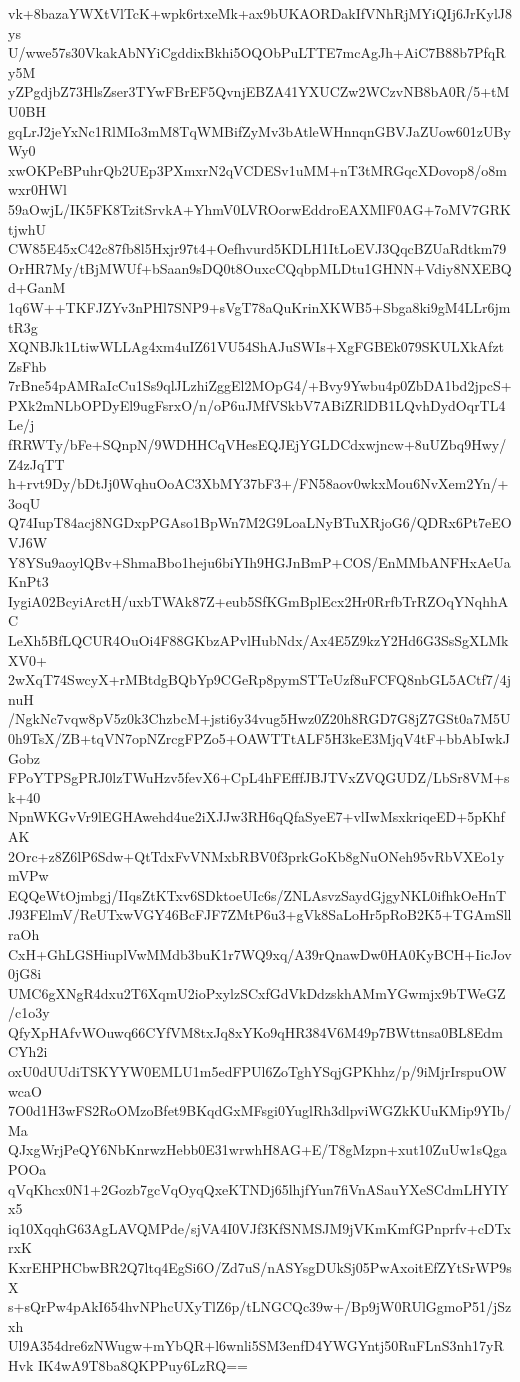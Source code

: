 vk+8bazaYWXtVlTcK+wpk6rtxeMk+ax9bUKAORDakIfVNhRjMYiQIj6JrKylJ8ys
U/wwe57s30VkakAbNYiCgddixBkhi5OQObPuLTTE7mcAgJh+AiC7B88b7PfqRy5M
yZPgdjbZ73HlsZser3TYwFBrEF5QvnjEBZA41YXUCZw2WCzvNB8bA0R/5+tMU0BH
gqLrJ2jeYxNc1RlMIo3mM8TqWMBifZyMv3bAtleWHnnqnGBVJaZUow601zUByWy0
xwOKPeBPuhrQb2UEp3PXmxrN2qVCDESv1uMM+nT3tMRGqcXDovop8/o8mwxr0HWl
59aOwjL/IK5FK8TzitSrvkA+YhmV0LVROorwEddroEAXMlF0AG+7oMV7GRKtjwhU
CW85E45xC42c87fb8l5Hxjr97t4+Oefhvurd5KDLH1ItLoEVJ3QqcBZUaRdtkm79
OrHR7My/tBjMWUf+bSaan9sDQ0t8OuxcCQqbpMLDtu1GHNN+Vdiy8NXEBQd+GanM
1q6W++TKFJZYv3nPHl7SNP9+sVgT78aQuKrinXKWB5+Sbga8ki9gM4LLr6jmtR3g
XQNBJk1LtiwWLLAg4xm4uIZ61VU54ShAJuSWIs+XgFGBEk079SKULXkAfztZsFhb
7rBne54pAMRaIcCu1Ss9qlJLzhiZggEl2MOpG4/+Bvy9Ywbu4p0ZbDA1bd2jpcS+
PXk2mNLbOPDyEl9ugFsrxO/n/oP6uJMfVSkbV7ABiZRlDB1LQvhDydOqrTL4Le/j
fRRWTy/bFe+SQnpN/9WDHHCqVHesEQJEjYGLDCdxwjncw+8uUZbq9Hwy/Z4zJqTT
h+rvt9Dy/bDtJj0WqhuOoAC3XbMY37bF3+/FN58aov0wkxMou6NvXem2Yn/+3oqU
Q74IupT84acj8NGDxpPGAso1BpWn7M2G9LoaLNyBTuXRjoG6/QDRx6Pt7eEOVJ6W
Y8YSu9aoylQBv+ShmaBbo1heju6biYIh9HGJnBmP+COS/EnMMbANFHxAeUaKnPt3
IygiA02BcyiArctH/uxbTWAk87Z+eub5SfKGmBplEcx2Hr0RrfbTrRZOqYNqhhAC
LeXh5BfLQCUR4OuOi4F88GKbzAPvlHubNdx/Ax4E5Z9kzY2Hd6G3SsSgXLMkXV0+
2wXqT74SwcyX+rMBtdgBQbYp9CGeRp8pymSTTeUzf8uFCFQ8nbGL5ACtf7/4jnuH
/NgkNc7vqw8pV5z0k3ChzbcM+jsti6y34vug5Hwz0Z20h8RGD7G8jZ7GSt0a7M5U
0h9TsX/ZB+tqVN7opNZrcgFPZo5+OAWTTtALF5H3keE3MjqV4tF+bbAbIwkJGobz
FPoYTPSgPRJ0lzTWuHzv5fevX6+CpL4hFEfffJBJTVxZVQGUDZ/LbSr8VM+sk+40
NpnWKGvVr9lEGHAwehd4ue2iXJJw3RH6qQfaSyeE7+vlIwMsxkriqeED+5pKhfAK
2Orc+z8Z6lP6Sdw+QtTdxFvVNMxbRBV0f3prkGoKb8gNuONeh95vRbVXEo1ymVPw
EQQeWtOjmbgj/IIqsZtKTxv6SDktoeUIc6s/ZNLAsvzSaydGjgyNKL0ifhkOeHnT
J93FElmV/ReUTxwVGY46BcFJF7ZMtP6u3+gVk8SaLoHr5pRoB2K5+TGAmSllraOh
CxH+GhLGSHiuplVwMMdb3buK1r7WQ9xq/A39rQnawDw0HA0KyBCH+IicJov0jG8i
UMC6gXNgR4dxu2T6XqmU2ioPxylzSCxfGdVkDdzskhAMmYGwmjx9bTWeGZ/c1o3y
QfyXpHAfvWOuwq66CYfVM8txJq8xYKo9qHR384V6M49p7BWttnsa0BL8EdmCYh2i
oxU0dUUdiTSKYYW0EMLU1m5edFPUl6ZoTghYSqjGPKhhz/p/9iMjrIrspuOWwcaO
7O0d1H3wFS2RoOMzoBfet9BKqdGxMFsgi0YuglRh3dlpviWGZkKUuKMip9YIb/Ma
QJxgWrjPeQY6NbKnrwzHebb0E31wrwhH8AG+E/T8gMzpn+xut10ZuUw1sQgaPOOa
qVqKhcx0N1+2Gozb7gcVqOyqQxeKTNDj65lhjfYun7fiVnASauYXeSCdmLHYIYx5
iq10XqqhG63AgLAVQMPde/sjVA4I0VJf3KfSNMSJM9jVKmKmfGPnprfv+cDTxrxK
KxrEHPHCbwBR2Q7ltq4EgSi6O/Zd7uS/nASYsgDUkSj05PwAxoitEfZYtSrWP9sX
s+sQrPw4pAkI654hvNPhcUXyTlZ6p/tLNGCQc39w+/Bp9jW0RUlGgmoP51/jSzxh
Ul9A354dre6zNWugw+mYbQR+l6wnli5SM3enfD4YWGYntj50RuFLnS3nh17yRHvk
IK4wA9T8ba8QKPPuy6LzRQ==

